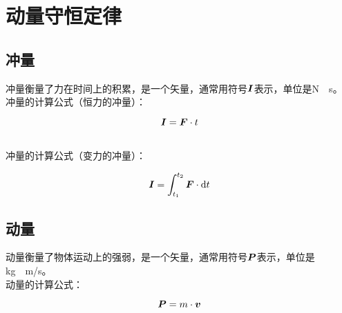 \documentclass[UTF8]{ctexart}
\newcommand*{\veb}[1]{\vb*{#1}}
\newcommand*{\dif}{\mathop{}\!\mathrm{d}}
\begin{document}
\newpage

\section{动量守恒定律}

\subsection{冲量}
    冲量衡量了力在时间上的积累，是一个矢量，通常用符号$\veb{I}$表示，单位是\si{N\cdot s}。\\[3mm]
    冲量的计算公式（恒力的冲量）：
    \begin{large}
        \begin{equation*}
            \veb{I}=\veb{F}\cdot t
        \end{equation*}
    \end{large}\\
    冲量的计算公式（变力的冲量）：
    \begin{large}
        \begin{equation*}
            \veb{I}=\int_{t_1}^{t_2}\veb{F}\cdot \dif t
        \end{equation*}
    \end{large}\vspace{-10pt}

\subsection{动量}
    动量衡量了物体运动上的强弱，是一个矢量，通常用符号$\veb{P}$表示，单位是\si{kg\cdot m/s}。\\[3mm]
    动量的计算公式：
    \begin{large}
        \begin{equation*}
            \veb{P}=m\cdot\veb{v}
        \end{equation*}
    \end{large}\vspace{-10pt}
\end{document}
